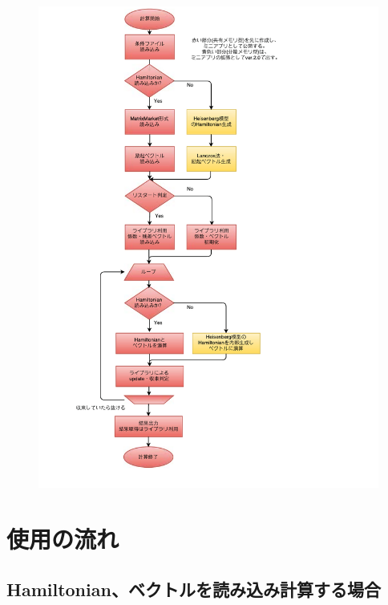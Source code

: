 \documentclass[12pt,titlepage]{jarticle}
\begin{document}
\begin{figure}[htbp]
\begin{center}
	\includegraphics[width=12cm]{flow.pdf}
	\label{Fig:CalcFlow}
\end{center}
\end{figure}


\newpage
\section{使用の流れ}\label{Sec:Usage}
\subsection{Hamiltonian、ベクトルを読み込み計算する場合}
\end{document}
